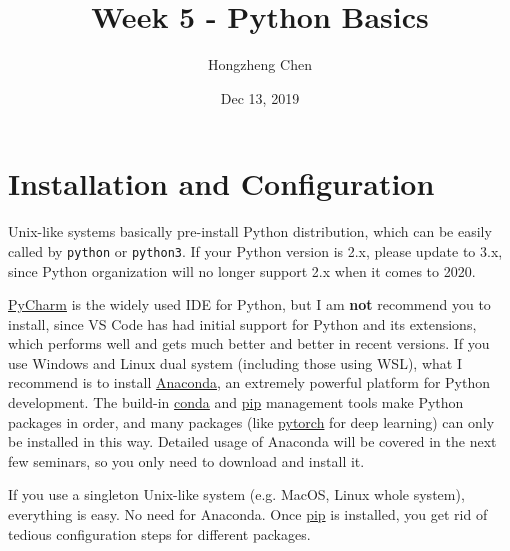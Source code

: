 \documentclass[english]{../TexTemplate/thesis}
\title{Week 5 - Python Basics}
\author{Hongzheng Chen}
\date{Dec 13, 2019}
\begin{document}
\maketitle

\section{Installation and Configuration}
Unix-like systems basically pre-install Python distribution, which can be easily called by \verb'python' or \verb'python3'.
If your Python version is 2.x, please update to 3.x, since Python organization will no longer support 2.x when it comes to 2020.

\href{https://www.jetbrains.com/pycharm/}{PyCharm} is the widely used IDE for Python, but I am \textbf{not} recommend you to install, since VS Code has had initial support for Python and its extensions, which performs well and gets much better and better in recent versions.
If you use Windows and Linux dual system (including those using WSL), what I recommend is to install \href{https://www.anaconda.com/}{Anaconda}, an extremely powerful platform for Python development. The build-in \href{https://conda.io/en/latest/}{conda} and \href{https://pypi.org/project/pip/}{pip} management tools make Python packages in order, and many packages (like \href{https://pytorch.org/}{pytorch} for deep learning) can only be installed in this way. Detailed usage of Anaconda will be covered in the next few seminars, so you only need to download and install it.

If you use a singleton Unix-like system (e.g. MacOS, Linux whole system), everything is easy. No need for Anaconda. Once \href{https://pypi.org/project/pip/}{pip} is installed, you get rid of tedious configuration steps for different packages.
\end{document}

